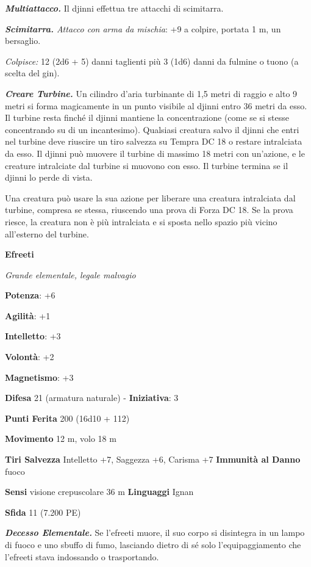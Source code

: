 \begin{multicols}{2}
\emph{\textbf{Multiattacco.}} Il djinni effettua tre attacchi di
scimitarra.

\emph{\textbf{Scimitarra.} Attacco con arma da mischia}: +9 a colpire,
portata 1 m, un bersaglio.

\emph{Colpisce:} 12 (2d6 + 5) danni taglienti più 3 (1d6) danni da
fulmine o tuono (a scelta del gin).

\emph{\textbf{Creare Turbine.}} Un cilindro d'aria turbinante di 1,5
metri di raggio e alto 9 metri si forma magicamente in un punto visibile
al djinni entro 36 metri da esso. Il turbine resta finché il djinni
mantiene la concentrazione (come se si stesse concentrando su di un
incantesimo). Qualsiasi creatura salvo il djinni che entri nel turbine
deve riuscire un tiro salvezza su Tempra DC 18 o restare intralciata da
esso. Il djinni può muovere il turbine di massimo 18 metri con
un'azione, e le creature intralciate dal turbine si muovono con esso. Il
turbine termina se il djinni lo perde di vista.

Una creatura può usare la sua azione per liberare una creatura
intralciata dal turbine, compresa se stessa, riuscendo una prova di
Forza DC 18. Se la prova riesce, la creatura non è più intralciata e si
sposta nello spazio più vicino all'esterno del turbine.

\textbf{Efreeti}

\emph{Grande elementale, legale malvagio}

\textbf{Potenza}: +6

\textbf{Agilità}: +1

\textbf{Intelletto}: +3

\textbf{Volontà}: +2

\textbf{Magnetismo}: +3

\textbf{Difesa} 21 (armatura naturale) - \textbf{Iniziativa}: 3

\textbf{Punti Ferita} 200 (16d10 + 112) 

\textbf{Movimento} 12 m, volo 18 m

\textbf{Tiri Salvezza} Intelletto +7, Saggezza +6, Carisma +7
\textbf{Immunità al Danno} fuoco

\textbf{Sensi} visione crepuscolare 36 m
\textbf{Linguaggi} Ignan

\textbf{Sfida} 11 (7.200 PE)\smallskip

\emph{\textbf{Decesso Elementale.}} Se l'efreeti muore, il suo corpo si
disintegra in un lampo di fuoco e uno sbuffo di fumo, lasciando dietro
di sé solo l'equipaggiamento che l'efreeti stava indossando o
trasportando.


\end{multicols}
